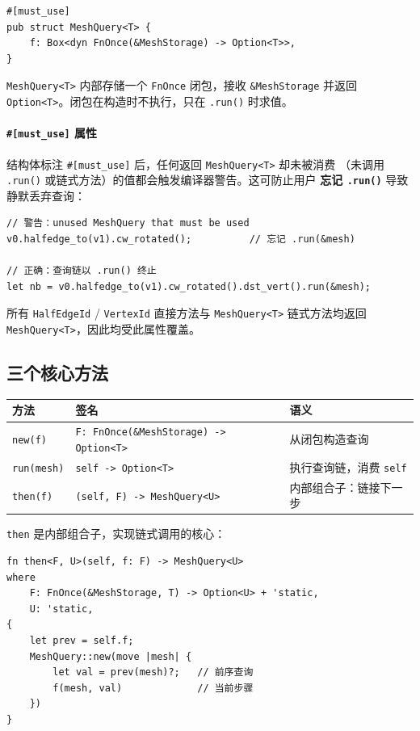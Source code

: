 \documentclass[11pt,a4paper]{article}
\begin{document}
\begin{lstlisting}
#[must_use]
pub struct MeshQuery<T> {
    f: Box<dyn FnOnce(&MeshStorage) -> Option<T>>,
}
\end{lstlisting}

\texttt{MeshQuery<T>} 内部存储一个 \texttt{FnOnce} 闭包，接收 \texttt{\&MeshStorage}
并返回 \texttt{Option<T>}。闭包在构造时不执行，只在 \texttt{.run()} 时求值。

\paragraph{\texttt{\#[must\_use]} 属性}
结构体标注 \texttt{\#[must\_use]} 后，任何返回 \texttt{MeshQuery<T>} 却未被消费
（未调用 \texttt{.run()} 或链式方法）的值都会触发编译器警告。这可防止用户
\textbf{忘记 \texttt{.run()}} 导致静默丢弃查询：
\begin{lstlisting}
// 警告：unused MeshQuery that must be used
v0.halfedge_to(v1).cw_rotated();          // 忘记 .run(&mesh)

// 正确：查询链以 .run() 终止
let nb = v0.halfedge_to(v1).cw_rotated().dst_vert().run(&mesh);
\end{lstlisting}
所有 \texttt{HalfEdgeId} / \texttt{VertexId} 直接方法与 \texttt{MeshQuery<T>}
链式方法均返回 \texttt{MeshQuery<T>}，因此均受此属性覆盖。

\subsection{三个核心方法}

\begin{center}
\renewcommand{\arraystretch}{1.20}
\begin{tabular}{@{}lll@{}}
  \toprule
  \textbf{方法} & \textbf{签名} & \textbf{语义} \\
  \midrule
  \texttt{new(f)} & \texttt{F: FnOnce(\&MeshStorage) -> Option<T>} & 从闭包构造查询 \\
  \texttt{run(mesh)} & \texttt{self -> Option<T>} & 执行查询链，消费 \texttt{self} \\
  \texttt{then(f)} & \texttt{(self, F) -> MeshQuery<U>} & 内部组合子：链接下一步 \\
  \bottomrule
\end{tabular}
\end{center}

\texttt{then} 是内部组合子，实现链式调用的核心：
\begin{lstlisting}
fn then<F, U>(self, f: F) -> MeshQuery<U>
where
    F: FnOnce(&MeshStorage, T) -> Option<U> + 'static,
    U: 'static,
{
    let prev = self.f;
    MeshQuery::new(move |mesh| {
        let val = prev(mesh)?;   // 前序查询
        f(mesh, val)             // 当前步骤
    })
}
\end{lstlisting}
\end{document}
